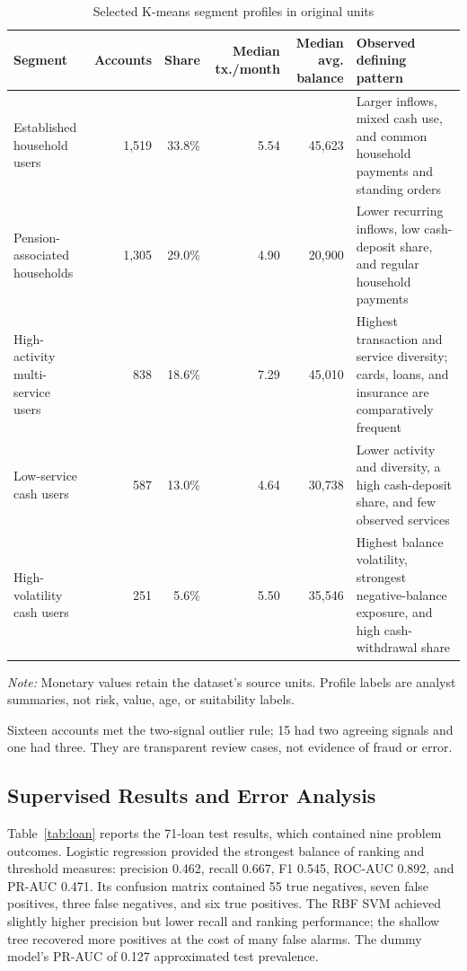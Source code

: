 \documentclass[conference]{IEEEtran}
\begin{document}
\begin{table}[t]
\caption{Selected K-means segment profiles in original units}
\label{tab:profiles}
\centering
\scriptsize
\begin{tabularx}{\textwidth}{X r r r r X}
\toprule
\textbf{Segment} & \textbf{Accounts} & \textbf{Share} & \textbf{Median tx./month} & \textbf{Median avg. balance} & \textbf{Observed defining pattern} \\
\midrule
Established household users & 1,519 & 33.8\% & 5.54 & 45,623 & Larger inflows, mixed cash use, and common household payments and standing orders \\
Pension-associated households & 1,305 & 29.0\% & 4.90 & 20,900 & Lower recurring inflows, low cash-deposit share, and regular household payments \\
High-activity multi-service users & 838 & 18.6\% & 7.29 & 45,010 & Highest transaction and service diversity; cards, loans, and insurance are comparatively frequent \\
Low-service cash users & 587 & 13.0\% & 4.64 & 30,738 & Lower activity and diversity, a high cash-deposit share, and few observed services \\
High-volatility cash users & 251 & 5.6\% & 5.50 & 35,546 & Highest balance volatility, strongest negative-balance exposure, and high cash-withdrawal share \\
\bottomrule
\end{tabularx}
\begin{minipage}{0.98\textwidth}
\vspace{1pt}\scriptsize
\emph{Note:} Monetary values retain the dataset's source units. Profile labels are analyst summaries, not risk, value, age, or suitability labels.
\end{minipage}
\end{table}

Sixteen accounts met the two-signal outlier rule; 15 had two agreeing signals and one had three. They are transparent review cases, not evidence of fraud or error.

\subsection{Supervised Results and Error Analysis}

Table~\ref{tab:loan} reports the 71-loan test results, which contained nine problem outcomes. Logistic regression provided the strongest balance of ranking and threshold measures: precision 0.462, recall 0.667, F1 0.545, ROC-AUC 0.892, and PR-AUC 0.471. Its confusion matrix contained 55 true negatives, seven false positives, three false negatives, and six true positives. The RBF SVM achieved slightly higher precision but lower recall and ranking performance; the shallow tree recovered more positives at the cost of many false alarms. The dummy model's PR-AUC of 0.127 approximated test prevalence.
\end{document}
